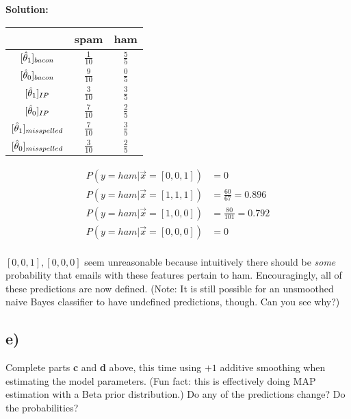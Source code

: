 \documentclass[a4paper]{article}
\begin{document}
\textbf{Solution:}

\begin{center}
\begin{tabular}{|c|c|c|}
\hline
     & spam & ham  \\
     \hline
     $[\Hat{\theta}_{1}]_{bacon}$ & $\frac{1}{10}$ & $\frac{5}{5}$ \\
     \hline
     $[\Hat{\theta}_{0}]_{bacon}$ & $\frac{9}{10}$ & $\frac{0}{5}$ \\
     \hline
     $[\Hat{\theta}_{1}]_{IP}$ & $\frac{3}{10}$ & $\frac{3}{5}$ \\
     \hline
     $[\Hat{\theta}_{0}]_{IP}$ & $\frac{7}{10}$ & $\frac{2}{5}$ \\
     \hline
     $[\Hat{\theta}_{1}]_{misspelled}$ & $\frac{7}{10}$ & $\frac{3}{5}$ \\
     \hline
     $[\Hat{\theta}_{0}]_{misspelled}$ & $\frac{3}{10}$ & $\frac{2}{5}$ \\
     \hline
\end{tabular}
\end{center}

\begin{align*}
P(y = ham | \vec{x} = [0,0,1]) &= 0 \\
P(y = ham | \vec{x} = [1,1,1]) &= \frac{60}{67} = 0.896\\
P(y = ham | \vec{x} = [1,0,0]) &= \frac{80}{101} = 0.792\\
P(y = ham | \vec{x} = [0,0,0]) &= 0 \\
\end{align*}


$[0,0,1], [0,0,0]$ seem unreasonable because intuitively there should be \emph{some} probability that emails with these features pertain to ham. Encouragingly, all of these predictions are now defined. (Note: It is still possible for an unsmoothed naive Bayes classifier to have undefined predictions, though. Can you see why?)

\subsection*{e)}
Complete parts \textbf{c} and \textbf{d} above, this time using $+1$ additive smoothing when estimating the model parameters. (Fun fact: this is effectively doing MAP estimation with a Beta prior distribution.) Do any of the predictions change? Do the probabilities? 
\end{document}
